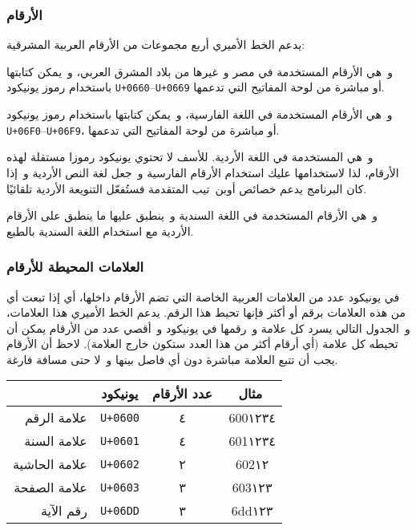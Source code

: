 \documentclass{article}
\newcommand\addff[1]{\addfontfeature{RawFeature={#1}}} %
\newcommand\addfl[1]{\addff{language=#1}}              %
\begin{document}
\subsubsection{الأرقام}
يدعم الخط الأميري أربع مجموعات من الأرقام العربية المشرقية:

\begin{description}[leftmargin=7em,style=sameline,font=\mdseries\addff{-pnum}]
\item[\addfl{ARA}٠١٢٣٤٥٦٧٨٩]
	و هي الأرقام المستخدمة في مصر و غيرها من بلاد المشرق العربي، و يمكن
	كتابتها باستخدام رموز يونيكود \texttt{U+0660}–\texttt{U+0669} أو
	مباشرة من لوحة المفاتيح التي تدعمها.

\item[\addfl{FAR}۰۱۲۳۴۵۶۷۸۹]
	و هي الأرقام المستخدمة في اللغة الفارسية، و يمكن كتابتها باستخدام
	رموز يونيكود \texttt{U+06F0}–\texttt{U+06F9}، أو مباشرة من لوحة
	المفاتيح التي تدعمها.

\item[\addfl{URD}۰۱۲۳۴۵۶۷۸۹]
	و هي المستخدمة في اللغة الأردية. للأسف لا تحتوي يونيكود رموزا مستقلة
	لهذه الأرقام، لذا لاستخدامها عليك استخدام الأرقام الفارسية و جعل لغة
	النص الأردية و إذا كان البرنامج يدعم خصائص أوبن تيب المتقدمة فستُفعّل
	التنويعة الأردية تلقائيًا.

\item[\addfl{SND}۰۱۲۳۴۵۶۷۸۹]
	و هي الأرقام المستخدمة في اللغة السندية و ينطبق عليها ما ينطبق على
	الأرقام الأردية مع استخدام اللغة السندية بالطبع.
\end{description}

\subsubsection{العلامات المحيطة للأرقام}
في يونيكود عدد من العلامات العربية الخاصة التي تضم الأرقام داخلها، أي
إذا تبعت أي من هذه العلامات برقم أو أكثر فإنها تحيط هذا الرقم. يدعم الخط
الأميري هذا العلامات، و الجدول التالي يسرد كل علامة و رقمها في يونيكود
و أقصي عدد من الأرقام يمكن أن تحيطه كل علامة (أي أرقام أكثر من هذا العدد
ستكون خارج العلامة). لاحظ أن الأرقام يجب أن تتبع العلامة مباشرة دون أي
فاصل بينها و لا حتى مسافة فارغة.

\begin{center}
  \begin{tabular}{r c c c}
    \hline
                  & يونيكود & عدد الأرقام & مثال     \\
    \hline
    علامة الرقم   & \texttt{U+0600} & ٤ & ^^^600١٢٣٤ \\
    علامة السنة   & \texttt{U+0601} & ٤ & ^^^601١٢٣٤ \\
    علامة الحاشية & \texttt{U+0602} & ٢ & ^^^602١٢   \\
    علامة الصفحة  & \texttt{U+0603} & ٣ & ^^^603١٢٣  \\
    رقم الآية     & \texttt{U+06DD} & ٣ & ^^^6dd١٢٣  \\
    \hline
  \end{tabular}
\end{center}
\end{document}
